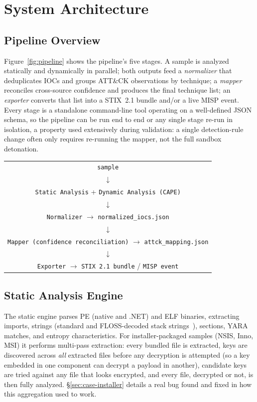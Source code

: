 \section{System Architecture}
\label{sec:architecture}

\subsection{Pipeline Overview}

Figure~\ref{fig:pipeline} shows the pipeline's five stages. A sample
is analyzed statically and dynamically in parallel; both outputs feed
a \emph{normalizer} that deduplicates IOCs and groups ATT\&CK
observations by technique; a \emph{mapper} reconciles cross-source
confidence and produces the final technique list; an \emph{exporter}
converts that list into a STIX~2.1 bundle and/or a live MISP event.
Every stage is a standalone command-line tool operating on a
well-defined JSON schema, so the pipeline can be run end to end or any
single stage re-run in isolation, a property used extensively during
validation: a single detection-rule change often only requires
re-running the mapper, not the full sandbox detonation.

\begin{center}
\begin{tabular}{c}
\texttt{sample} \\
$\downarrow$ \\
\texttt{Static Analysis} \quad + \quad \texttt{Dynamic Analysis (CAPE)} \\
$\downarrow$ \\
\texttt{Normalizer} $\rightarrow$ \texttt{normalized\_iocs.json} \\
$\downarrow$ \\
\texttt{Mapper (confidence reconciliation)} $\rightarrow$ \texttt{attck\_mapping.json} \\
$\downarrow$ \\
\texttt{Exporter} $\rightarrow$ \texttt{STIX 2.1 bundle} / \texttt{MISP event}
\end{tabular}
\label{fig:pipeline}
\end{center}

\subsection{Static Analysis Engine}
\label{sec:static-rules}

The static engine parses PE (native and .NET) and ELF binaries,
extracting imports, strings (standard and FLOSS-decoded stack
strings~\cite{floss}), sections, YARA matches, and entropy
characteristics. For installer-packaged samples (NSIS, Inno, MSI) it
performs multi-pass extraction: every bundled file is extracted, keys
are discovered across \emph{all} extracted files before any decryption
is attempted (so a key embedded in one component can decrypt a payload
in another), candidate keys are tried against any file that looks
encrypted, and every file, decrypted or not, is then fully analyzed.
\S\ref{sec:case-installer} details a real bug found and fixed in how
this aggregation used to work.

